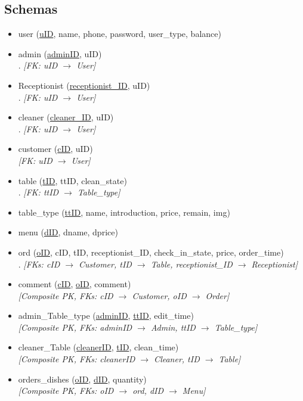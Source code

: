 \documentclass[12pt]{article}
\begin{document}
\subsection{Schemas}
\begin{itemize}
    \item user (\underline{uID}, name, phone, password, user\_type, balance)
    \item admin (\underline{adminID}, uID) \\.   \textit{[FK: uID $\rightarrow$ User]}
    \item Receptionist (\underline{receptionist\_ID}, uID)\\.   \textit{[FK: uID $\rightarrow$ User]}
    \item cleaner (\underline{cleaner\_ID}, uID)\\.   \textit{[FK: uID $\rightarrow$ User]}
    \item customer (\underline{cID}, uID)\\  \textit{[FK: uID $\rightarrow$ User]}
    \item table (\underline{tID}, ttID, clean\_state)\\.  \textit{[FK: ttID $\rightarrow$ Table\_type]}
    \item table\_type (\underline{ttID}, name, introduction, price, remain, img)
    \item menu (\underline{dID}, dname, dprice)
    \item ord (\underline{oID}, cID, tID, receptionist\_ID, check\_in\_state, price, order\_time)\\.   \textit{[FKs: cID $\rightarrow$ Customer, tID $\rightarrow$ Table, receptionist\_ID $\rightarrow$ Receptionist]}
    \item comment (\underline{cID}, \underline{oID}, comment)\\  \textit{[Composite PK, FKs: cID $\rightarrow$ Customer, oID $\rightarrow$ Order]}
    \item admin\_Table\_type (\underline{adminID}, \underline{ttID}, edit\_time)\\  \textit{[Composite PK, FKs: adminID $\rightarrow$ Admin, ttID $\rightarrow$ Table\_type]}
    \item cleaner\_Table (\underline{cleanerID}, \underline{tID}, clean\_time)\\  \textit{[Composite PK, FKs: cleanerID $\rightarrow$ Cleaner, tID $\rightarrow$ Table]}
    \item orders\_dishes (\underline{oID}, \underline{dID}, quantity)\\  \textit{[Composite PK, FKs: oID $\rightarrow$ ord, dID $\rightarrow$ Menu]}
\end{itemize}
\end{document}

